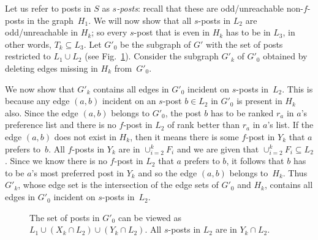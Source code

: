\documentclass[11pt]{llncs}
\begin{document}
Let us refer to posts in $S$ 
as {\em $s$-posts}: recall that these are odd/unreachable non-$f$-posts in the graph~$H_1$.
We will now show that all $s$-posts in $L_2$ are odd/unreachable in $H_k$;
so every $s$-post that is even in $H_k$ has to be in $L_3$, in other words, $T_k \subseteq L_3$. 
Let $G'_0$ be the subgraph of $G'$ with the set of posts restricted to $L_1 \cup L_2$ 
(see Fig.~\ref{fig:last-claim}).
Consider the subgraph $G'_k$ of $G'_0$ obtained by deleting edges missing in $H_k$ from~$G'_0$.

We now show that $G'_k$ contains all edges in $G'_0$ incident on $s$-posts in~$L_2$. 
This is because any edge $(a,b)$ incident on an $s$-post $b \in L_2$ in $G'_0$ is present 
in $H_k$ also. Since the edge $(a,b)$ belongs to $G'_0$, the post $b$ has to be ranked $r_a$ 
in $a$'s preference list and there is no $f$-post in $L_2$ of rank better than $r_a$ in $a$'s 
list. If the edge $(a,b)$ does not exist in $H_k$, then it means there is some $f$-post in 
$Y_k$ that $a$ prefers to~$b$. All $f$-posts in $Y_k$ are in $\cup_{i=2}^k F_i$ and we are given 
that $\cup_{i=2}^k F_i \subseteq L_2$. Since we know there is no $f$-post in $L_2$ that $a$ 
prefers to $b$, it follows that $b$ has to be $a$'s most preferred post in $Y_k$ and so the 
edge $(a,b)$ belongs to~$H_k$. Thus $G'_k$, whose edge set is the intersection of the edge sets 
of $G'_0$ and $H_k$, contains all edges in $G'_0$ incident on $s$-posts in~$L_2$. 

\begin{figure}[h]
\centerline{}
\caption{The set of posts in $G'_0$ can be viewed as $L_1 \cup (X_k\cap L_2) \cup (Y_k\cap L_2)$. 
All $s$-posts in $L_2$ are in $Y_k\cap L_2$.}
\label{fig:last-claim}
\end{figure}
\end{document}
